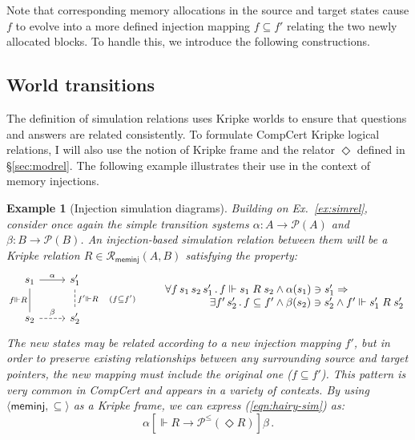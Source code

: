 \documentclass[11pt,oneside]{book}
\newtheorem{example}[theorem]{Example}
\theoremstyle{definition}
\newcommand{\kw}[1]{\ensuremath{ \mathsf{#1} }}
\newcommand{\ifr}[1]{\mathrel{[{#1}]}}
\begin{document}
Note that corresponding memory allocations
in the source and target states cause $f$ to
evolve into a more defined injection mapping $f \subseteq f'$
relating the two newly allocated blocks.
To handle this,
we introduce the following constructions.


\subsection{World transitions} %

The definition of simulation relations
uses Kripke worlds to ensure that questions and answers
are related consistently.
To formulate CompCert Kripke logical relations,
I will also use the notion of Kripke frame
and the relator $\Diamond$ defined in \S\ref{sec:modrel}.
The following example illustrates their use
in the context of memory injections.

\begin{example}[Injection simulation diagrams] \label{ex:sim} %
Building on Ex.~\ref{ex:simrel},
consider once again the simple transition systems
$\alpha : A \rightarrow \mathcal{P}(A)$ and
$\beta : B \rightarrow \mathcal{P}(B)$.
An injection-based simulation relation between them
will be a Kripke relation
$R \in \mathcal{R}_\kw{meminj}(A, B)$
satisfying the property:
\begin{equation}
    \label{eqn:hairy-sim}
  \begin{tikzcd}[scale=0.8]
    s_1 \arrow[r, "\alpha"]
        \arrow[d, dash, "f \Vdash R"'] &
    s_1' \arrow[d, dashed, dash, "f' \Vdash R \quad (f \subseteq f')"] \\
    s_2 \arrow[r, dashed, "\beta"] &
    s_2'
  \end{tikzcd}
  \qquad
    \begin{array}{r@{}l}
    \forall f \, s_1 \, s_2 \, s_1' \,.\,
      f \Vdash s_1 \mathrel{R} s_2 &{} \wedge
      \alpha(s_1) \ni s_1' \Rightarrow \\
    \exists f' \, s_2' \,.\,
      f \subseteq f' &{} \wedge
      \beta(s_2) \ni s_2' \wedge
      f' \Vdash s_1' \mathrel{R} s_2'
    \end{array}
\end{equation}
The new states may be related according to
a new injection mapping $f'$,
but in order to preserve existing relationships
between any surrounding source and target pointers,
the new mapping must include
the original one ($f \subseteq f'$).
This pattern is very common in CompCert
and appears in a variety of contexts.
By using $\langle \kw{meminj}, {\subseteq} \rangle$
as a Kripke frame,
we can express
(\ref{eqn:hairy-sim}) as:
\[
  \alpha \ifr{\Vdash R \rightarrow \mathcal{P}^\le(\Diamond R)} \beta \,.
\]
\end{example}
\end{document}
